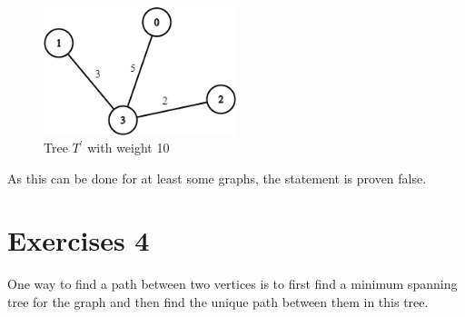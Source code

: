 \documentclass[nobib]{tufte-handout}
\begin{document}
\begin{figure}
    \centering
    \includegraphics[width=0.5\textwidth]{graphics/L6_prim_kruskal_dijkstra/distinctWeights3.png}
    \caption{Tree $T^\prime$ with weight 10}
    \label{fig:G}
\end{figure}

As this can be done for at least some graphs, the statement is proven false.
\newpage

\section{Exercises 4}

  One way to find a path between two vertices is to first find a minimum spanning tree for the graph and then find the unique path between them in this tree.  
\end{document}
